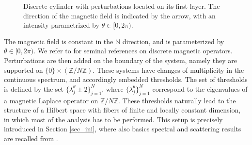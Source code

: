 \documentclass[11pt]{article}
\def\N{\mathbb N}
\def\R{\mathbb R}
\def\Z{\mathbb Z}
\begin{document}
\begin{figure}[h]
\caption{Discrete cylinder with perturbations located on its first layer.
The direction of the magnetic field is indicated by the arrow, with an intensity
parametrized by $\theta \in [0,2\pi)$.}
\label{fig:cylinder}
\end{figure}
The magnetic field is constant in the $\N$ direction, and is parameterized by $\theta\in [0,2\pi)$.
We refer to \cite{CdV,KS} for seminal references on discrete magnetic operators.
Perturbations are then added on the boundary of the system, namely
they are supported on $\{0\}\times (\Z/N \Z)$.
These systems have changes of multiplicity in the continuous spectrum, 
and accordingly embedded thresholds. The set
of thresholds is defined by the set $\{\lambda^\theta_j\pm 2\}_{j=1}^N$, 
where $\{\lambda^\theta_j\}_{j=1}^N$ correspond to the eigenvalues of a magnetic Laplace operator on $\Z/N\Z$. 
These thresholds naturally lead to the structure of a Hilbert space with fibers of finite and locally constant dimension, in which most of the analysis has to be performed.
This setup is precisely introduced in Section \ref{sec_ini}, where also basics spectral
and scattering results are recalled from \cite{NRT}.
\end{document}
